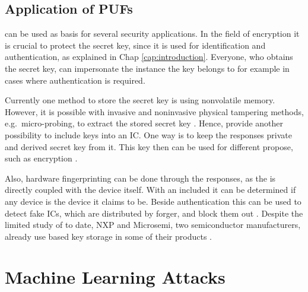 \subsection{Application of PUFs}
\label{sec:applicationsofpufs}

\pufs can be used as basis for several security applications.
In the field of encryption it is crucial to protect the secret key, since it is used for identification and authentication, as explained in Chap \ref{cap:introduction}.
Everyone, who obtains the secret key, can impersonate the instance the key belongs to for example in cases where  authentication is required.

Currently one method to store the secret key is using nonvolatile memory.
However, it is possible with invasive and noninvasive physical tampering methods, e.g.\ micro-probing, to extract the stored secret key \cite{Lim2005ExtractingCircuits}. %
Hence, \pufs provide another possibility to include keys into an \ac{IC}.
One way is to keep the \puf responses private and derived secret key from it.
This key then can be used for different propose, such as encryption \cite{Tajik2014PhysicalPUFs}.

Also, hardware fingerprinting can be done through the \puf responses, as the \puf is directly coupled with the device itself.
With an included \puf it can be determined if any device is the device it claims to be. %
Beside authentication this can be used to detect fake \acp{IC}, which are distributed by forger, and block them out \cite{Machida2015ImplementationFPGA}.
Despite the limited study of \pufs to date, \ac{NXP} and Microsemi, two semiconductor manufacturers, already use \puf based key storage in some of their products \cite{Becker2015ThePUFs}.



\section{Machine Learning Attacks}

